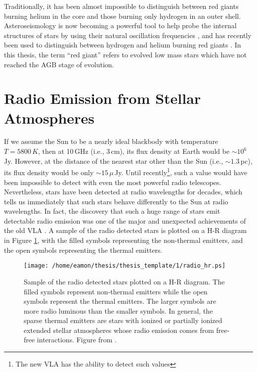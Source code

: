 Traditionally, it has been almost impossible to distinguish between red giants burning helium in the core and those burning only hydrogen in an outer shell. Asteroseismology is now becoming a powerful tool to help probe the internal structures of stars by using their natural oscillation frequencies \citep{beck_2011}, and has recently been used to distinguish between hydrogen and helium burning red giants \citep{bedding_2011}. In this thesis, the term ``red giant'' refers to evolved low mass stars which have not reached the AGB stage of evolution.

\section{Radio Emission from Stellar Atmospheres}\label{sec:1.6}
If we assume the Sun to be a nearly ideal blackbody with temperature $T=5800\,K$, then at 10\,GHz (i.e., 3\,cm), its flux density at Earth would be $\sim 10^{6}$\,Jy. However, at the distance of the nearest star other than the Sun (i.e., $\sim 1.3$\,pc), its flux density would be only $\sim 15\,\mu$\,Jy. Until recently\footnote{The new VLA has the ability to detect such values}, such a value would have been impossible to detect with even the most powerful radio telescopes. Nevertheless, stars have been detected at radio wavelengths for decades, which tells us immediately that such stars behave differently to the Sun at radio wavelengths. In fact, the discovery that such a huge range of stars emit detectable radio emission was one of the major and unexpected achievements of the old VLA \citep{white_2000}. A sample of the radio detected stars is plotted on a H-R diagram in Figure \ref{fig:1.6.1}, with the filled symbols representing the non-thermal emitters, and the open symbols representing the thermal emitters. 

\begin{figure}[ht!]
\centering 
          \texttt{[image: /home/eamon/thesis/thesis\_template/1/radio\_hr.ps]}
\caption[Radio H-R diagram]{Sample of the radio detected stars plotted on a H-R diagram. The filled symbols represent non-thermal emitters while the open symbols represent the thermal emitters. The larger symbols are more radio luminous than the smaller symbols. In general, the sparse thermal emitters are stars with ionized or partially ionized extended stellar atmospheres whose radio emission comes from free-free interactions. Figure from \cite{white_2000}.}
\label{fig:1.6.1}
\end{figure}

